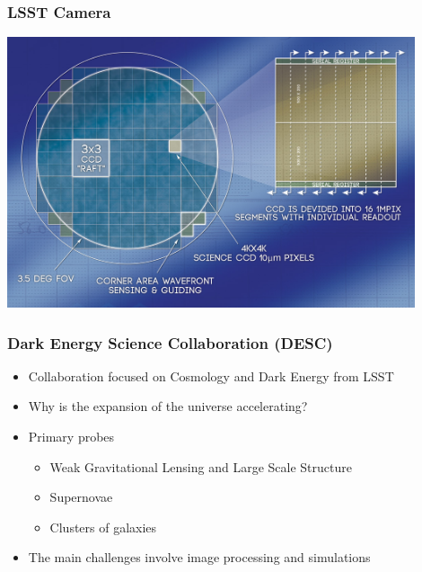 \documentclass{beamer}
\begin{document}
{

    \frame
    {
        \frametitle{LSST Camera}
     
        \begin{center}
            \includegraphics[width=0.9\textwidth]{LSST_FocalPlane_med.jpg}
            \newline
        \end{center}

    }

}


\frame
{
    \frametitle{Dark Energy Science Collaboration (DESC)}

 
    \begin{itemize}

        \item Collaboration focused on Cosmology and Dark Energy from LSST

        \item Why is the expansion of the universe accelerating?

        \item Primary probes

            \begin{itemize}
                \item Weak Gravitational Lensing and Large Scale Structure
                \item Supernovae
                \item Clusters of galaxies
            \end{itemize}

        \item The main challenges involve image processing and simulations

    \end{itemize}

}
\end{document}
